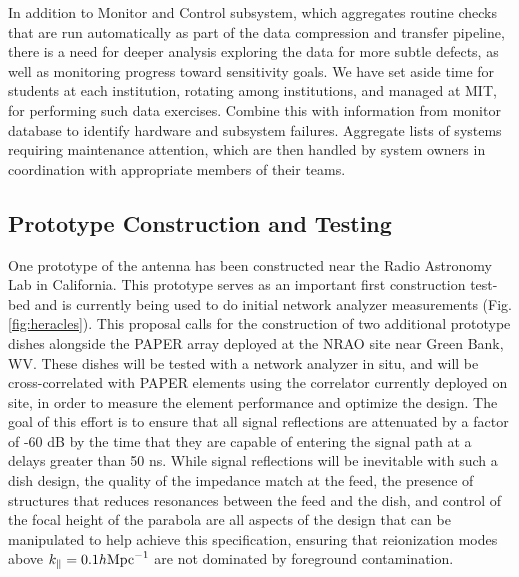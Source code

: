 \documentclass[preprint]{aastex}
\begin{document}
In addition to Monitor and Control subsystem, which aggregates routine checks that are run automatically as
part of the data compression and transfer pipeline, there is a need for deeper analysis
exploring the data for more subtle defects, as well as monitoring progress toward sensitivity goals.
We have set aside time for students at each institution, rotating among institutions, and managed at MIT,
for performing such data exercises.
Combine this with information from monitor database to identify hardware and subsystem failures.
Aggregate lists of systems requiring maintenance attention, which are then handled by system owners
in coordination with appropriate members of their teams.

\vspace{-0.25in}
\subsection{Prototype Construction and Testing}
\vspace{-6pt}

One prototype of the antenna has been constructed near the Radio Astronomy Lab in California. 
This prototype serves as an important first construction test-bed and is currently being used to do 
initial network analyzer measurements (Fig. \ref{fig:heracles}).
This proposal calls for the construction of two additional prototype dishes alongside
the PAPER array deployed at the NRAO site near Green Bank, WV.
These dishes will be tested
with a network analyzer in situ, and will be cross-correlated with PAPER elements using
the correlator currently deployed on site, in order to measure
the element performance and optimize the design.  The goal of this effort is to ensure
that all signal reflections
are attenuated by a factor of -60 dB by the time that they are capable of entering the signal path
at a delays greater than 50 ns.  While signal reflections will be inevitable with such a dish
design, the quality of the impedance match at the feed,
the presence of structures that reduces resonances between
the feed and the dish, and control of the focal height of the parabola are all aspects
of the design that can
be manipulated to help achieve this specification, ensuring that reionization modes above
$k_\parallel=0.1h {\rm Mpc}^{-1}$ are not dominated by foreground contamination.
\end{document}
